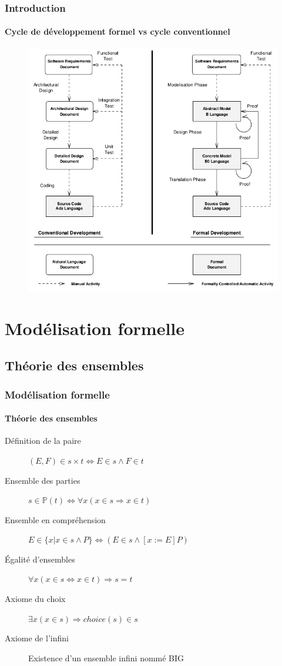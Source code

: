 \documentclass[11pt,a4paper,xcolor=table]{beamer} %
\begin{document}
\begin{frame}
\frametitle{Introduction} 
\framesubtitle{Cycle de développement formel vs cycle conventionnel}
\begin{figure}[h]
\centering
\includegraphics[scale=0.33]{ressources/formal_dev.png}
\end{figure}
\end{frame}

%
%
\frame{\tableofcontents}

\section{Modélisation formelle}
\subsection{Théorie des ensembles}
\begin{frame}
\frametitle{Modélisation formelle}
\framesubtitle{Théorie des ensembles}
\begin{description}
\item[Définition de la paire] $(E, F) \in s \times t \Leftrightarrow E \in s \wedge F \in t$
\item[Ensemble des parties] $s \in \mathbb{P}(t) \Leftrightarrow \forall x (x \in s \Rightarrow x \in t)$
\item[Ensemble en compréhension] $E \in \{ x | x \in s \wedge P \} \Leftrightarrow (E \in s \wedge [x:= E] P)$
\item[Égalité d'ensembles] $\forall x (x \in s \Leftrightarrow x \in t) \Rightarrow s = t$
\item[Axiome du choix] $\exists x  (x \in s) \Rightarrow choice(s) \in s$
\item[Axiome de l'infini] Existence d'un ensemble infini nommé BIG
\end{description}
\end{frame}
\end{document}
